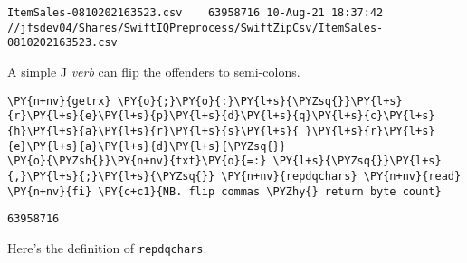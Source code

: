     \begin{Verbatim}[commandchars=\\\{\}]
ItemSales-0810202163523.csv    63958716 10-Aug-21 18:37:42
//jfsdev04/Shares/SwiftIQPreprocess/SwiftZipCsv/ItemSales-0810202163523.csv
    \end{Verbatim}

    A simple J \emph{verb} can flip the offenders to semi-colons.

    \begin{tcolorbox}[breakable, size=fbox, boxrule=1pt, pad at break*=1mm,colback=cellbackground, colframe=cellborder]
\begin{Verbatim}[commandchars=\\\{\}]
\PY{n+nv}{getrx} \PY{o}{;}\PY{o}{:}\PY{l+s}{\PYZsq{}}\PY{l+s}{r}\PY{l+s}{e}\PY{l+s}{p}\PY{l+s}{d}\PY{l+s}{q}\PY{l+s}{c}\PY{l+s}{h}\PY{l+s}{a}\PY{l+s}{r}\PY{l+s}{s}\PY{l+s}{ }\PY{l+s}{r}\PY{l+s}{e}\PY{l+s}{a}\PY{l+s}{d}\PY{l+s}{\PYZsq{}}
\PY{o}{\PYZsh{}}\PY{n+nv}{txt}\PY{o}{=:} \PY{l+s}{\PYZsq{}}\PY{l+s}{,}\PY{l+s}{;}\PY{l+s}{\PYZsq{}} \PY{n+nv}{repdqchars} \PY{n+nv}{read} \PY{n+nv}{fi} \PY{c+c1}{NB. flip commas \PYZhy{} return byte count}
\end{Verbatim}
\end{tcolorbox}

    \begin{Verbatim}[commandchars=\\\{\}]
63958716
    \end{Verbatim}

    Here's the definition of \texttt{repdqchars}.

